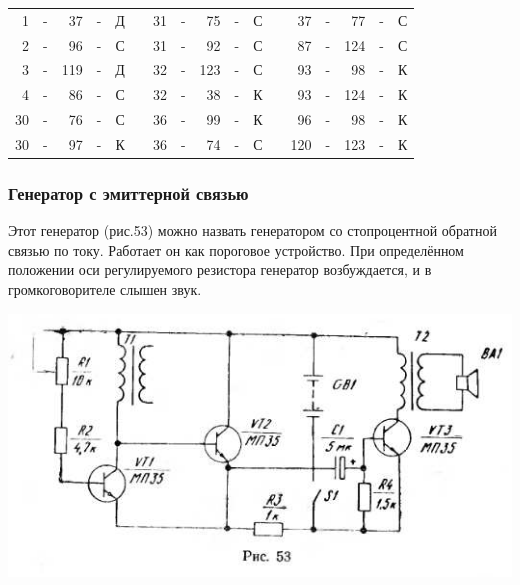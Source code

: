 \documentclass[12pt]{article}
\begin{document}
\hrulefill

\begin{tabular}{r c r c r p{2cm} r c r c r p{2cm} r c r c r}
 1 & - &  37 & - & Д &     &  31 & - &  75 & - & С &    &  37 & - &  77 & - & С\\
 2 & - &  96 & - & С &     &  31 & - &  92 & - & С &    &  87 & - & 124 & - & С\\
 3 & - & 119 & - & Д &     &  32 & - & 123 & - & С &    &  93 & - &  98 & - & К\\
 4 & - &  86 & - & С &     &  32 & - &  38 & - & К &    &  93 & - & 124 & - & К\\
30 & - &  76 & - & С &     &  36 & - &  99 & - & К &    &  96 & - &  98 & - & К\\
30 & - &  97 & - & К &     &  36 & - &  74 & - & С &    & 120 & - & 123 & - & К\\
\end{tabular}

\hrulefill

\subsubsection{Генератор с эмиттерной связью}

Этот генератор (рис.53) можно назвать генератором со стопроцентной обратной связью по току. Работает он как пороговое устройство. При определённом положении оси регулируемого резистора генератор возбуждается, и в громкоговорителе слышен звук.

\newpage

\includegraphics[scale=1, angle=1]{ekon3_053_1}

\hrulefill
\end{document}
